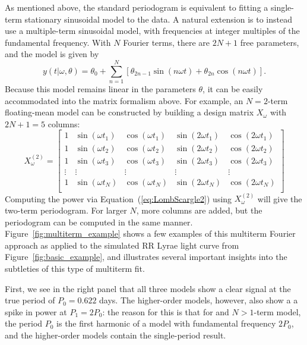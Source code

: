 \documentclass[12pt,preprint]{aastex}
\newcommand{\Fig}[1]{Figure~\ref{fig:#1}}
\newcommand{\fig}[1]{\Fig{#1}}
\newcommand{\Eq}[1]{Equation~(\ref{eq:#1})}
\newcommand{\eq}[1]{\Eq{#1}}
\begin{document}
As mentioned above, the standard periodogram is equivalent to fitting a single-term stationary sinusoidal model to the data. A natural extension is to instead use a multiple-term sinusoidal model, with frequencies at integer multiples of the fundamental frequency. With $N$ Fourier terms, there are $2N + 1$ free parameters, and the model is given by
\begin{equation}
  y(t|\omega,\theta) = \theta_0 + \sum_{n=1}^N \left[\theta_{2n - 1}\sin(n\omega t) + \theta_{2n}\cos(n\omega t)\right].
\end{equation}
Because this model remains linear in the parameters $\theta$, it can be easily accommodated into the matrix formalism above. For example, an $N = 2$-term floating-mean model can be constructed by building a design matrix $X_\omega$ with $2N + 1 = 5$ columns:
\begin{equation}
X_\omega^{(2)} = \left[
\begin{array}{ccccc}
1 & \sin(\omega t_1) & \cos(\omega t_1) & \sin(2\omega t_1) & \cos(2\omega t_1)\\
1 & \sin(\omega t_2) & \cos(\omega t_2) & \sin(2\omega t_2) & \cos(2\omega t_2)\\
1 & \sin(\omega t_3) & \cos(\omega t_3) & \sin(2\omega t_3) & \cos(2\omega t_3)\\
\vdots & \vdots & \vdots & \vdots & \vdots \\
1 & \sin(\omega t_N) & \cos(\omega t_N) & \sin(2\omega t_N) & \cos(2\omega t_N)\\
\end{array}
\right]
\end{equation}
Computing the power via \eq{LombScargle2} using $X_\omega^{(2)}$ will give the two-term periodogram. For larger $N$, more columns are added, but the periodogram can be computed in the same manner. \fig{multiterm_example} shows a few examples of this multiterm Fourier approach as applied to the simulated RR Lyrae light curve from \fig{basic_example}, and illustrates several important insights into the subtleties of this type of multiterm fit.

First, we see in the right panel that all three models show a clear signal at the true period of $P_0 = 0.622$ days. The higher-order models, however, also show a a spike in power at $P_1 = 2 P_0$: the reason for this is that for and $N>1$-term model, the period $P_0$ is the first harmonic of a model with fundamental frequency $2P_0$, and the higher-order models contain the single-period result.
\end{document}
